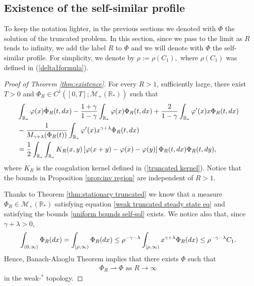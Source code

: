 \documentclass[11pt]{article}
\numberwithin{equation}{section}
\theoremstyle{plain}
\newcommand{\der}{\textup{d}}
\begin{document}
\subsection{Existence of the self-similar profile} \label{sec:existence self-similar profile}
To keep the notation lighter, in the previous sections we denoted with $\Phi$ the solution of the truncated problem. In this section, since we pass to the limit as $R$ tends to infinity, we add the label $R$ to $\Phi$ and we will denote with $\Phi$ the self-similar profile.  
For simplicity, we denote by $\rho:=\rho(C_{1}),$ where $\rho(C_{1})$ was defined in (\ref{delta1formula}). 
\begin{proof}[Proof of Theorem \ref{thm:existence}]
For every $R>1$, sufficiently large, there exist $T>0$ and $\Phi_{R}\in  C^1([0,T];\mathcal M_{+}(\mathbb R_*))$ such that
\begin{align*}
& \int_{\mathbb R_*} \varphi(x) \dot{\Phi}_{R}(t, \der x)- \frac{1+\gamma}{1-\gamma} \int_{\mathbb R_*}  \varphi(x) \Phi_{R}(t, \der x) +
\frac{2}{1-\gamma} \int_{\mathbb R_*}  \varphi'(x) x \Phi_{R}(t, \der x) \\
& - \frac{1}{M_{\gamma+\lambda}(\Phi_{R}(t))}  \int_{\mathbb R_*}  \varphi'(x) x^{\gamma + \lambda}\Phi_{R}(t, \der x)  \\
& =\frac{1}{2}\int_{\mathbb R_*} \int_{\mathbb R_*} K_R(x,y) \left[ \varphi(x+y)- \varphi(x) - \varphi(y) \right] \Phi_{R}(t, \der x) \Phi_{R}(t, \der y), 
\end{align*} 
where $K_{R}$ is the coagulation kernel defined in (\ref{truncated kernel}). Notice that the bounds in Proposition \ref{prop:inv region} are independent of $R>1$. 

Thanks to Theorem \ref{thm:stationary truncated} we know that a measure $\Phi_R \in \mathcal M_+(\mathbb R_*) $ satisfying equation \eqref{weak truncated steady state eq} and satisfying the bounds  
\eqref{uniform bounds self-sol} exists.
We notice also that, since $\gamma + \lambda>0$,
\begin{align}\label{everybound}
    \int_{(0,\infty)}\Phi_{R}(\der x)=\int_{[\rho,\infty)}\Phi_{R}(\der x)\leq \rho^{-\gamma-\lambda}\int_{[\rho,\infty)}x^{\gamma+\lambda}\Phi_{R}(\der x)\leq \rho^{-\gamma-\lambda}C_{1}.
\end{align}
Hence, Banach-Alaoglu Theorem implies that there exists $\Phi$ such that 
\begin{align}\label{convergence_fixed_points}
\Phi_R \rightharpoonup \Phi \text{ as } R \rightarrow \infty
\end{align}
in the weak-$^{\ast}$ topology.


\end{proof}
\end{document}
